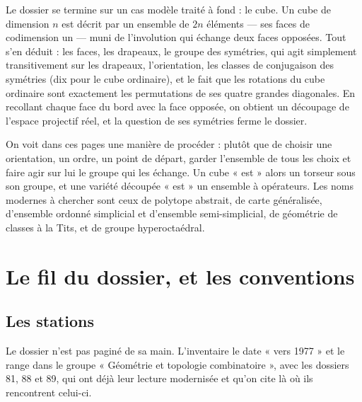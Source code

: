\documentclass[11pt,a4paper]{article}
\begin{document}
\begin{resume}
Le dossier se termine sur un cas modèle traité à fond : le cube. Un cube de
dimension $n$ est décrit par un ensemble de $2n$ éléments --- ses faces de
codimension un --- muni de l'involution qui échange deux faces opposées. Tout
s'en déduit : les faces, les drapeaux, le groupe des symétries, qui agit
simplement transitivement sur les drapeaux, l'orientation, les classes de
conjugaison des symétries (dix pour le cube ordinaire), et le fait que les
rotations du cube ordinaire sont exactement les permutations de ses quatre
grandes diagonales. En recollant chaque face du bord avec la face opposée, on
obtient un découpage de l'espace projectif réel, et la question de ses
symétries ferme le dossier.

On voit dans ces pages une manière de procéder : plutôt que de choisir une
orientation, un ordre, un point de départ, garder l'ensemble de tous les
choix et faire agir sur lui le groupe qui les échange. Un cube « est » alors
un torseur sous son groupe, et une variété découpée « est » un ensemble à
opérateurs. Les noms modernes à chercher sont ceux de polytope abstrait, de
carte généralisée, d'ensemble ordonné simplicial et d'ensemble
semi-simplicial, de géométrie de classes à la Tits, et de groupe
hyperoctaédral.

\end{resume}

\section*{Le fil du dossier, et les conventions}

\subsection*{Les stations}

Le dossier n'est pas paginé de sa main. L'inventaire le date « vers 1977 » et
le range dans le groupe « Géométrie et topologie combinatoire », avec les
dossiers 81, 88 et 89, qui ont déjà leur lecture modernisée et qu'on cite là
où ils rencontrent celui-ci.
\end{document}
